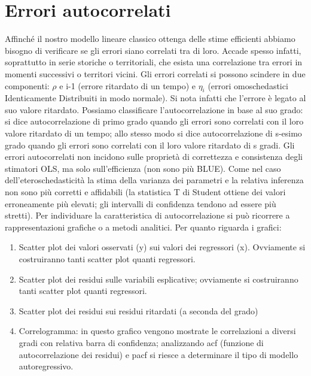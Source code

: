 \documentclass[a4page, 11pt]{article}
\begin{document}
\section{Errori autocorrelati}

Affinché il nostro modello lineare classico ottenga delle stime efficienti abbiamo bisogno di verificare se gli errori siano correlati tra di loro.
\newline
Accade spesso infatti, soprattutto in serie storiche o territoriali, che esista una correlazione tra errori in momenti successivi o territori vicini.
\newline
Gli errori correlati si possono scindere in due componenti: $\rho$ e i-1 (errore ritardato di un tempo) e $\eta_i$ (errori omoschedastici Identicamente Distribuiti in modo normale). Si nota infatti che l’errore è legato al suo valore ritardato.
\newline
Possiamo classificare l’autocorrelazione in base al suo grado: si dice autocorrelazione di primo grado quando gli errori sono correlati con il loro valore ritardato di un tempo; allo stesso modo si dice autocorrelazione di s-esimo grado quando gli errori sono correlati con il loro valore ritardato di s gradi. Gli errori autocorrelati non incidono sulle proprietà di correttezza e consistenza degli stimatori OLS, ma solo sull’efficienza (non sono più BLUE). Come nel caso dell’eteroschedasticità la stima della varianza dei parametri e la relativa inferenza non sono più corretti e affidabili (la statistica T di Student ottiene dei valori erroneamente più elevati; gli intervalli di confidenza tendono ad essere più stretti).
Per individuare la caratteristica di autocorrelazione si può ricorrere a rappresentazioni grafiche o a metodi analitici.
\newline
Per quanto riguarda i grafici:
\begin{enumerate}[noitemsep]
\item Scatter plot dei valori osservati (y) sui valori dei regressori (x). Ovviamente si costruiranno tanti scatter plot quanti regressori.
\item Scatter plot dei residui sulle variabili esplicative; ovviamente si costruiranno tanti scatter plot quanti regressori.
\item Scatter plot dei residui sui residui ritardati (a seconda del grado)
\item Correlogramma: in questo grafico vengono mostrate le correlazioni a diversi gradi con relativa barra di confidenza; analizzando acf (funzione di autocorrelazione dei residui) e pacf si riesce a determinare il tipo di modello autoregressivo.
\end{enumerate}
\end{document}
